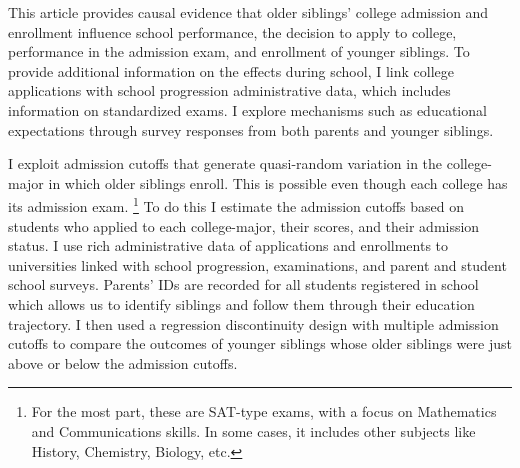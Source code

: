 This article provides causal evidence that older siblings' college admission and enrollment influence school performance, the decision to apply to college, performance in the admission exam, and enrollment of younger siblings. To provide additional information on the effects during school, I link college applications with school progression administrative data, which includes information on standardized exams. I explore mechanisms such as educational expectations through survey responses from both parents and younger siblings.





\begin{comment}
[PEER EFFECTS BARRIOS-FERNANDEZ] information transmission, direct academic support, and changes in preferences (e.g., changes in aspirations and motivation, taste for spending time with peers). Assessing the relevance of these different mechanisms is important to understand which policy tools governments have available to support students. For instance, if the main driver of peer effects on educational trajectories is the transmission of information, then governments could design strategies to substitute for the lack of informed peers and directly provide information to students. 

Independently of the mechanisms behind peer effects, the existence of social spillovers on educational trajectories is relevant to understand inequality in educational achievement. They imply that the consequences of the barriers and challenges disproportionately affecting certain groups of students are amplified through their social networks.
\end{comment}


I exploit admission cutoffs that generate quasi-random variation in the college-major in which older siblings enroll. This is possible even though each college has its admission exam. \footnote{For the most part, these are SAT-type exams, with a focus on Mathematics and Communications skills. In some cases, it includes other subjects like History, Chemistry, Biology, etc.} To do this I estimate the admission cutoffs based on students who applied to each college-major, their scores, and their admission status. I use rich administrative data of applications and enrollments to universities linked with school progression, examinations, and parent and student school surveys. Parents' IDs are recorded for all students registered in school which allows us to identify siblings and follow them through their education trajectory. I then used a regression discontinuity design with multiple admission cutoffs to compare the outcomes of younger siblings whose older siblings were just above or below the admission cutoffs.

